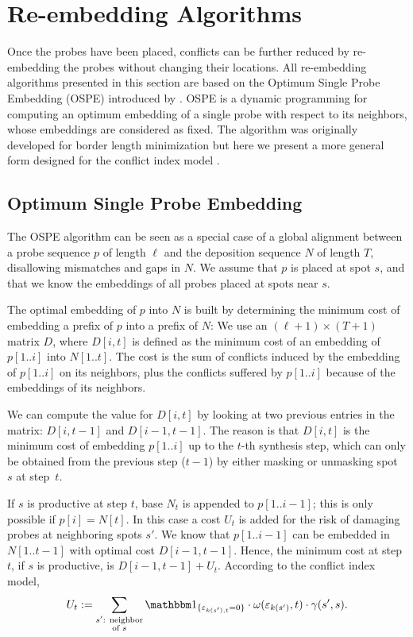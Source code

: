 \chapter{Re-embedding Algorithms}
\label{ch:reembed}

Once the probes have been placed, conflicts can be further reduced by
re-embedding the probes without changing their locations. All
re-embedding algorithms presented in this section are based on the
Optimum Single Probe Embedding (OSPE) introduced by \citet{Kahng2002}.
OSPE is a dynamic programming for computing an optimum embedding of a
single probe with respect to its neighbors, whose embeddings are
considered as fixed. The algorithm was originally developed for border
length minimization but here we present a more general form designed
for the conflict index model \citep{Carvalho2006}.

\section{Optimum Single Probe Embedding}
\label{sec:reembed_ospe}

The OSPE algorithm can be seen as a special case of a global alignment
between a probe sequence $p$ of length $\ell$ and the deposition
sequence $N$ of length $T$, disallowing mismatches and gaps in $N$.
We assume that $p$ is placed at spot $s$, and that we know the
embeddings of all probes placed at spots near $s$.

The optimal embedding of $p$ into $N$ is built by determining the
minimum cost of embedding a prefix of $p$ into a prefix of $N$: We use
an $(\ell + 1) \times (T + 1)$ matrix $D$, where $D[i,t]$ is defined
as the minimum cost of an embedding of $p[1..i]$ into $N[1..t]$. The
cost is the sum of conflicts induced by the embedding of $p[1..i]$ on
its neighbors, plus the conflicts suffered by $p[1..i]$ because of the
embeddings of its neighbors.

We can compute the value for $D[i,t]$ by looking at two previous
entries in the matrix: $D[i,t-1]$ and $D[i-1,t-1]$. The reason is that
$D[i,t]$ is the minimum cost of embedding $p[1..i]$ up to the
$t$-th synthesis step, which can only be obtained from the previous
step ($t-1$) by either masking or unmasking spot~$s$ at step~$t$.

If $s$ is productive at step $t$, base $N_t$ is appended to
$p[1..i-1]$; this is only possible if $p[i]=N[t]$. In this case a cost
$U_t$ is added for the risk of damaging probes at neighboring spots
$s'$. We know that $p[1..i-1]$ can be embedded in $N[1..t-1]$ with
optimal cost $D[i-1,t-1]$.  Hence, the minimum cost at step $t$, if
$s$ is productive, is $D[i-1,t-1] + U_t$.  According to the conflict
index model,
\[
U_t := \sum_{\substack{s'\text{: neighbor}\\\text{of } s}}
  \Ind{\eps_{k(s'),t}=0}
  \cdot \omega(\eps_{k(s')},t)
  \cdot \gamma(s',s).
\]


